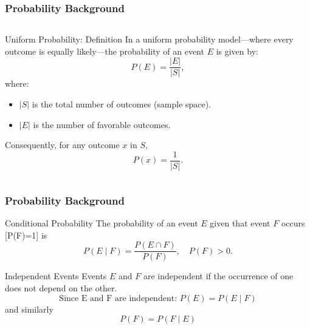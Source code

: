     \begin{frame}
      \frametitle{Probability Background}
      \begin{columns}[T]
           \begin{block}{Uniform Probability: Definition}
    In a uniform probability model—where every outcome is equally likely—the probability of an event \(E\) is given by:
    \[
      P(E) = \frac{|E|}{|S|},
    \]
    where:
    \begin{itemize}
      \item \(|S|\) is the total number of outcomes (sample space).
      \item \(|E|\) is the number of favorable outcomes.
    \end{itemize}
    Consequently, for any outcome \(x\) in \(S\),
    \[
      P(x) = \frac{1}{|S|}.
    \]
  \end{block}
          
          \centering
      \end{columns}
    \end{frame}
    
      \begin{frame}
          \frametitle{Probability Background}
        
      \begin{block}{Conditional Probability}
        The probability of an event \(E\) given that event \(F\) occurs [P(F)=1] is
        \[
          P(E \mid F) = \frac{P(E \cap F)}{P(F)}, \quad P(F) > 0.
        \] 
        \end{block}            
        \begin{block}{Independent Events} 
        Events \(E\) and \(F\) are independent if the occurrence of one does not depend on the other.
        \[
          \text{Since E and F are independent: }
          P(E) = P(E \mid F)
        \]
        and similarly
        \[
          P(F) = P(F \mid E)
        \]
      \end{block}
    
    \end{frame}

